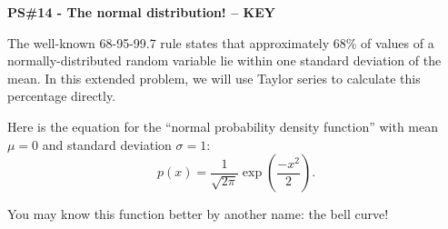 \documentclass[10pt]{article}
\renewcommand{\section}[1]{\begin{center} \textbf{#1} \\\end{center}}
\begin{document}
%


\allowdisplaybreaks
\section{PS\#14 - The normal distribution! -- {\color{red} KEY} }

\everymath{\displaystyle}
The well-known 68-95-99.7 rule states that approximately 68\% of values of a normally-distributed random variable lie within one standard deviation of the mean. In this extended problem, we will use Taylor series to calculate this percentage directly.

Here is the equation for the ``normal probability density function'' with mean $\mu=0$ and standard deviation $\sigma=1$: \[p(x) = \frac{1}{\sqrt{2\pi}} \exp\left(\frac{-x^2}{2}\right).\]

You may know this function better by another name: the bell curve!
\end{document}
